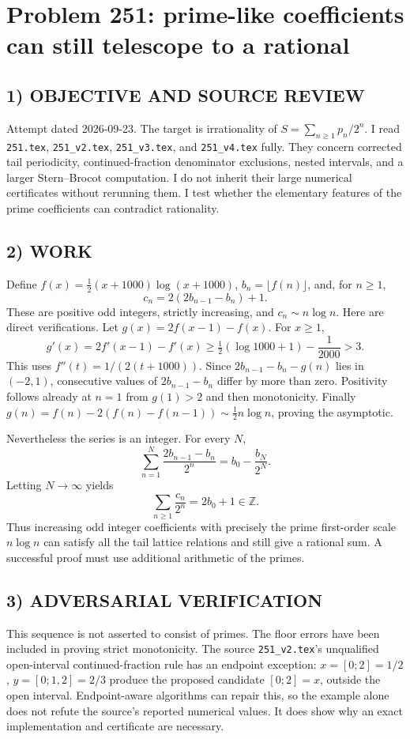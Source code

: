 \section{Problem 251: prime-like coefficients can still telescope to a rational}
\subsection*{1) OBJECTIVE AND SOURCE REVIEW}
Attempt dated 2026-09-23. The target is irrationality of $S=\sum_{n\ge1}p_n/2^n$. I read \texttt{251.tex}, \texttt{251\_v2.tex}, \texttt{251\_v3.tex}, and \texttt{251\_v4.tex} fully. They concern corrected tail periodicity, continued-fraction denominator exclusions, nested intervals, and a larger Stern--Brocot computation. I do not inherit their large numerical certificates without rerunning them. I test whether the elementary features of the prime coefficients can contradict rationality.
\subsection*{2) WORK}
Define $f(x)=\tfrac12(x+1000)\log(x+1000)$, $b_n=\lfloor f(n)\rfloor$, and, for $n\ge1$,
\[
c_n=2(2b_{n-1}-b_n)+1.
\]
These are positive odd integers, strictly increasing, and $c_n\sim n\log n$. Here are direct verifications. Let $g(x)=2f(x-1)-f(x)$. For $x\ge1$,
\[
g'(x)=2f'(x-1)-f'(x)
\ge\tfrac12(\log1000+1)-\frac1{2000}>3.
\]
This uses $f''(t)=1/(2(t+1000))$. Since $2b_{n-1}-b_n-g(n)$ lies in $(-2,1)$, consecutive values of $2b_{n-1}-b_n$ differ by more than zero. Positivity follows already at $n=1$ from $g(1)>2$ and then monotonicity. Finally $g(n)=f(n)-2(f(n)-f(n-1))\sim\tfrac12 n\log n$, proving the asymptotic.

Nevertheless the series is an integer. For every $N$,
\[
\sum_{n=1}^N\frac{2b_{n-1}-b_n}{2^n}=b_0-\frac{b_N}{2^N}.
\]
Letting $N\to\infty$ yields
\[
\sum_{n\ge1}\frac{c_n}{2^n}=2b_0+1\in\mathbb Z.
\]
Thus increasing odd integer coefficients with precisely the prime first-order scale $n\log n$ can satisfy all the tail lattice relations and still give a rational sum. A successful proof must use additional arithmetic of the primes.
\subsection*{3) ADVERSARIAL VERIFICATION}
This sequence is not asserted to consist of primes. The floor errors have been included in proving strict monotonicity. The source \texttt{251\_v2.tex}'s unqualified open-interval continued-fraction rule has an endpoint exception: $x=[0;2]=1/2$, $y=[0;1,2]=2/3$ produce the proposed candidate $[0;2]=x$, outside the open interval. Endpoint-aware algorithms can repair this, so the example alone does not refute the source's reported numerical values. It does show why an exact implementation and certificate are necessary.
